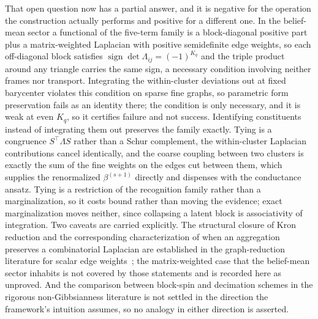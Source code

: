 \documentclass[11pt]{article}
\begin{document}
That open question now has a partial answer, and it is negative for the operation the construction actually performs and positive for a different one. In the belief-mean sector a functional of the five-term family is a block-diagonal positive part plus a matrix-weighted Laplacian with positive semidefinite edge weights, so each off-diagonal block satisfies $\operatorname{sign}\det\Lambda_{ij} = (-1)^{K_q}$ and the triple product around any triangle carries the same sign, a necessary condition involving neither frames nor transport. Integrating the within-cluster deviations out at fixed barycenter violates this condition on sparse fine graphs, so parametric form preservation fails as an identity there; the condition is only necessary, and it is weak at even $K_q$, so it certifies failure and not success. Identifying constituents instead of integrating them out preserves the family exactly. Tying is a congruence $S^\top\Lambda S$ rather than a Schur complement, the within-cluster Laplacian contributions cancel identically, and the coarse coupling between two clusters is exactly the sum of the fine weights on the edges cut between them, which supplies the renormalized $\beta^{(s+1)}$ directly and dispenses with the conductance ansatz. Tying is a restriction of the recognition family rather than a marginalization, so it costs bound rather than moving the evidence; exact marginalization moves neither, since collapsing a latent block is associativity of integration. Two caveats are carried explicitly. The structural closure of Kron reduction and the corresponding characterization of when an aggregation preserves a combinatorial Laplacian are established in the graph-reduction literature for scalar edge weights~\cite{DorflerBullo2013, Loukas2019}; the matrix-weighted case that the belief-mean sector inhabits is not covered by those statements and is recorded here as unproved. And the comparison between block-spin and decimation schemes in the rigorous non-Gibbsianness literature is not settled in the direction the framework's intuition assumes, so no analogy in either direction is asserted.
\end{document}
